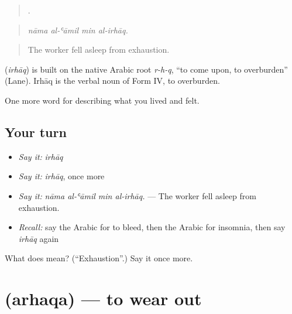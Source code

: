 \begin{quote}
   .
\end{quote}

\begin{quote}
\emph{nāma al-ʿāmil min al-irhāq.}
\end{quote}

\begin{quote}
The worker fell asleep from exhaustion.
\end{quote}

\begin{cousinweb}
\textbf{} (\emph{irhāq}) is built on the native Arabic root \emph{r-h-q}, \textquotedblleft{}to come upon, to overburden\textquotedblright{} (Lane). Irhāq is the verbal noun of Form IV, to overburden.
\end{cousinweb}

\begin{grammarlens}[title={What you've built}]
One more word for describing what you lived and felt.
\end{grammarlens}

\subsection*{Your turn}
\begin{itemize}
\raggedright
  \item \emph{Say it:} \emph{irhāq}
  \item \emph{Say it:} \emph{irhāq}, once more
  \item \emph{Say it:} \emph{nāma al-ʿāmil min al-irhāq.} — The worker fell asleep from exhaustion.
  \item \emph{Recall:} say the Arabic for to bleed, then the Arabic for insomnia, then say \emph{irhāq} again
\end{itemize}

\begin{tcolorbox}[breakable,colback=teal!4,colframe=teal!35!black,title={Before you move on}]
What does  mean? (\textquotedblleft{}Exhaustion\textquotedblright{}.) Say it once more.
\end{tcolorbox}
\section[\texorpdfstring{\ar{أرهق} (arhaqa)}{أرهق (arhaqa)}]{ (arhaqa) — to wear out}

\label{lesson:AR-C514-arhaqa}



